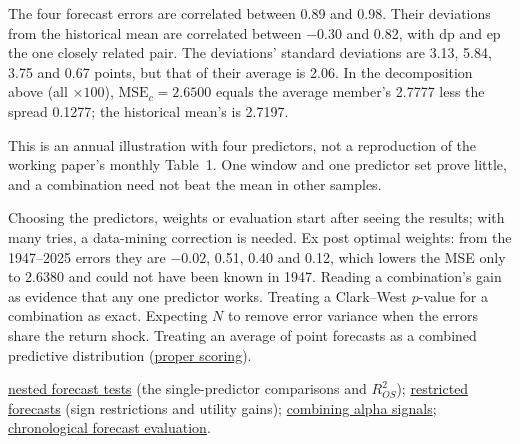 \begin{qfmethod}
The four forecast errors are correlated between 0.89 and 0.98. Their deviations from the historical mean are correlated between $-0.30$ and 0.82, with dp and ep the one closely related pair. The deviations' standard deviations are 3.13, 5.84, 3.75 and 0.67 points, but that of their average is 2.06. In the decomposition above (all $\times100$), $\mathrm{MSE}_c=2.6500$ equals the average member's 2.7777 less the spread 0.1277; the historical mean's is 2.7197.

This is an annual illustration with four predictors, not a reproduction of the working paper's monthly Table~1. One window and one predictor set prove little, and a combination need not beat the mean in other samples.

 Choosing the predictors, weights or evaluation start after seeing the results; with many tries, a data-mining correction is needed. Ex post optimal weights: from the 1947--2025 errors they are $-0.02$, 0.51, 0.40 and 0.12, which lowers the MSE only to 2.6380 and could not have been known in 1947. Reading a combination's gain as evidence that any one predictor works. Treating a Clark--West $p$-value for a combination as exact. Expecting $N$ to remove error variance when the errors share the return shock. Treating an average of point forecasts as a combined predictive distribution (\hyperref[meth:proper-scoring-rules]{proper scoring}).

 \hyperref[meth:nested-forecast-tests]{nested forecast tests} (the single-predictor comparisons and $R^2_{OS}$); \hyperref[meth:restricted-forecast-value]{restricted forecasts} (sign restrictions and utility gains); \hyperref[meth:alpha-signal-combination]{combining alpha signals}; \hyperref[meth:forecast-accuracy-evaluation]{chronological forecast evaluation}.

\end{qfmethod}

